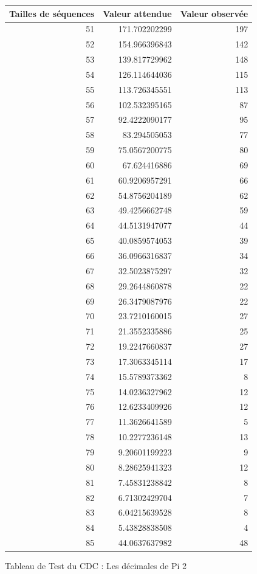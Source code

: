 \documentclass[10pt,a4paper]{article}
\begin{document}
\begin{figure}[h]
\centering
\begin{tabular}{|r|r|r|}
\hline
Tailles de séquences & Valeur attendue & Valeur observée\\
\hline
51 & 171.702202299 & 197\\
52 & 154.966396843 & 142\\
53 & 139.817729962 & 148\\
54 & 126.114644036 & 115\\
55 & 113.726345551 & 113\\
56 & 102.532395165 & 87\\
57 & 92.4222090177 & 95\\
58 & 83.294505053 & 77\\
59 & 75.0567200775 & 80\\
60 & 67.624416886 & 69\\
61 & 60.9206957291 & 66\\
62 & 54.8756204189 & 62\\
63 & 49.4256662748 & 59\\
64 & 44.5131947077 & 44\\
65 & 40.0859574053 & 39\\
66 & 36.0966316837 & 34\\
67 & 32.5023875297 & 32\\
68 & 29.2644860878 & 22\\
69 & 26.3479087976 & 22\\
70 & 23.7210160015 & 27\\
71 & 21.3552335886 & 25\\
72 & 19.2247660837 & 27\\
73 & 17.3063345114 & 17\\
74 & 15.5789373362 & 8\\
75 & 14.0236327962 & 12\\
76 & 12.6233409926 & 12\\
77 & 11.3626641589 & 5\\
78 & 10.2277236148 & 13\\
79 & 9.20601199223 & 9\\
80 & 8.28625941323 & 12\\
81 & 7.45831238842 & 8\\
82 & 6.71302429704 & 7\\
83 & 6.04215639528 & 8\\
84 & 5.43828838508 & 4\\
85 & 44.0637637982 & 48\\
\hline
\end{tabular}
\caption{Tableau de Test du CDC : Les décimales de Pi 2}
\end{figure}
\end{document}

